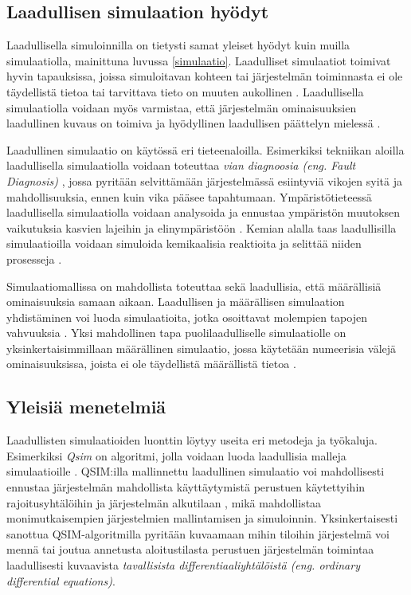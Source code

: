 \documentclass[utf8]{gradu3}
\begin{document}
\subsection{Laadullisen simulaation hyödyt}
Laadullisella simuloinnilla on tietysti samat yleiset hyödyt 
kuin muilla simulaatiolla, mainittuna luvussa \ref{simulaatio}. 
Laadulliset simulaatiot toimivat hyvin tapauksissa, 
joissa simuloitavan kohteen tai järjestelmän toiminnasta 
ei ole täydellistä tietoa tai tarvittava tieto on 
muuten aukollinen \parencite{kuipers1986qualitative}. 
Laadullisella simulaatiolla voidaan myös varmistaa, että järjestelmän
ominaisuuksien laadullinen kuvaus on toimiva ja hyödyllinen 
laadullisen päättelyn mielessä \parencite{kuipers1986qualitative}.

Laadullinen simulaatio on käytössä eri tieteenaloilla.
Esimerkiksi tekniikan aloilla laadullisella simulaatiolla voidaan toteuttaa
\textit{vian diagnoosia (eng. Fault Diagnosis)} \parencite{QualitativeReasoning1997},
jossa pyritään selvittämään järjestelmässä esiintyviä vikojen syitä ja mahdollisuuksia, 
ennen kuin vika pääsee tapahtumaan.
Ympäristötieteessä laadullisella simulaatiolla voidaan analysoida ja ennustaa
ympäristön muutoksen vaikutuksia kasvien lajeihin ja elinympäristöön \parencite{qualiAnalysisEnviron2010}.
Kemian alalla taas laadullisilla simulaatioilla voidaan simuloida kemikaalisia 
reaktioita ja selittää niiden prosesseja \parencite{chemistryQualitativeSim2002}.

Simulaatiomallissa on mahdollista toteuttaa sekä laadullisia, 
että määrällisiä ominaisuuksia samaan aikaan. 
Laadullisen ja määrällisen simulaation yhdistäminen voi luoda simulaatioita, 
jotka osoittavat molempien tapojen vahvuuksia 
\parencite{semiHybrid1997qualitative}. 
Yksi mahdollinen tapa puolilaadulliselle simulaatiolle on yksinkertaisimmillaan
määrällinen simulaatio, jossa käytetään numeerisia välejä ominaisuuksissa, 
joista ei ole täydellistä määrällistä tietoa \parencite{semiHybrid1997qualitative}.

\subsection{Yleisiä menetelmiä} \label{yleiset menetelmat}
Laadullisten simulaatioiden luonttin löytyy useita eri metodeja ja työkaluja.
Esimerkiksi \textit{Qsim} on algoritmi, jolla voidaan luoda laadullisia malleja simulaatioille
\parencite{kuipers1986qualitative}. 
QSIM:illa mallinnettu laadullinen simulaatio voi mahdollisesti ennustaa 
järjestelmän mahdollista käyttäytymistä perustuen käytettyihin rajoitusyhtälöihin 
ja järjestelmän alkutilaan \parencite{kuipers1986qualitative}, mikä mahdollistaa
monimutkaisempien järjestelmien mallintamisen ja simuloinnin.
Yksinkertaisesti sanottua QSIM-algoritmilla pyritään kuvaamaan mihin tiloihin
järjestelmä voi mennä tai joutua annetusta aloitustilasta 
perustuen järjestelmän toimintaa laadullisesti kuvaavista 
\textit{ tavallisista differentiaaliyhtälöistä 
(eng. ordinary differential equations)}.
\end{document}
